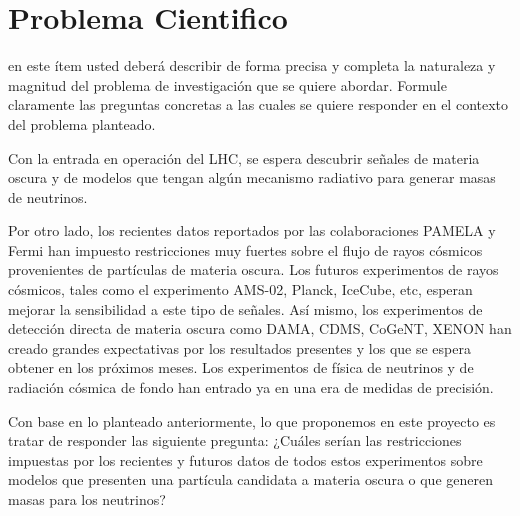 \section{Problema Cientifico}	
\begin{instrucciones}
  en este ítem usted deberá describir de forma
precisa y completa la naturaleza y magnitud del problema de investigación que se quiere
abordar. Formule claramente las preguntas concretas a las cuales se quiere responder en el
contexto del problema planteado.
\end{instrucciones}


Con la entrada en operación del LHC, se espera descubrir señales de materia oscura y de modelos que tengan algún mecanismo radiativo para generar masas de neutrinos.

Por otro lado, los recientes datos reportados por las colaboraciones PAMELA y Fermi han impuesto restricciones muy fuertes sobre el flujo de rayos cósmicos provenientes de partículas de materia oscura. Los futuros experimentos de rayos cósmicos, tales como el experimento AMS-02, Planck, IceCube, etc, esperan mejorar la sensibilidad a este tipo de señales. Así mismo, los experimentos de detección directa de materia oscura como DAMA, CDMS, CoGeNT, XENON han creado grandes expectativas por los resultados presentes y los que se espera obtener en los próximos meses. Los experimentos de física de neutrinos y de radiación cósmica de fondo han entrado ya en una era de medidas de precisión.

Con base en lo planteado anteriormente, lo que proponemos en este proyecto es tratar de responder las siguiente pregunta: ¿Cuáles serían las restricciones impuestas por los recientes y futuros datos de todos estos experimentos sobre  modelos que presenten una partícula candidata a materia oscura o que generen masas para los neutrinos?

